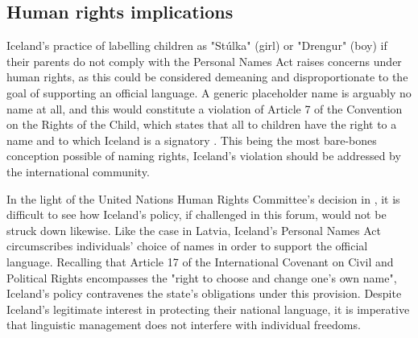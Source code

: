 \subsection{Human rights implications}

Iceland's practice of labelling children as "Stúlka" (girl) or "Drengur" (boy)
if their parents do not comply with the Personal Names Act raises concerns
under human rights, as this could be considered demeaning and disproportionate
to the goal of supporting an official language. A generic placeholder name is
arguably no name at all, and this would constitute a violation of Article 7 of
the Convention on the Rights of the Child, which states that all to children
have the right to a name and to which Iceland is a signatory \parencite{crc}.
This being the most bare-bones conception possible of naming rights, Iceland's
violation should be addressed by the international community.

In the light of the United Nations Human Rights Committee's decision in
\parencite{raihman10}, it is difficult to see how Iceland's policy, if
challenged in this forum, would not be struck down likewise. Like the case
in Latvia, Iceland's Personal Names Act circumscribes individuals' choice of
names in order to support the official language. Recalling that Article 17 of
the International Covenant on Civil and Political Rights encompasses the "right
to choose and change one's own name", Iceland's policy contravenes the state's
obligations under this provision. Despite Iceland's legitimate interest in
protecting their national language, it is imperative that linguistic management
does not interfere with individual freedoms.
